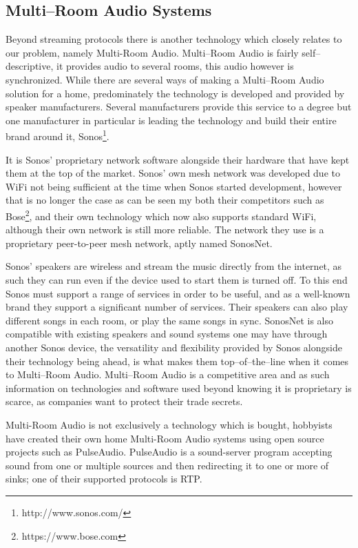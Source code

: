 \subsection{Multi--Room Audio Systems}
Beyond streaming protocols there is another technology which closely relates to our problem, namely Multi-Room Audio.
Multi--Room Audio is fairly self--descriptive, it provides audio to several rooms, this audio however is synchronized.
While there are several ways of making a Multi--Room Audio solution for a home, predominately the technology is developed and provided by speaker manufacturers.
Several manufacturers provide this service to a degree but one manufacturer in particular is leading the technology and build their entire brand around it, Sonos\footnote{http://www.sonos.com/}.

It is Sonos' proprietary network software alongside their hardware that have kept them at the top of the market.
Sonos' own mesh network was developed due to WiFi not being sufficient at the time when Sonos started development, however that is no longer the case as can be seen my both their competitors such as Bose\footnote{https://www.bose.com}, and their own technology which now also supports standard WiFi, although their own network is still more reliable.\cite{sonos1}
The network they use is a proprietary peer-to-peer mesh network, aptly named SonosNet.\cite{sonosWiki}

Sonos' speakers are wireless and stream the music directly from the internet, as such they can run even if the device used to start them is turned off.
To this end Sonos must support a range of services in order to be useful, and as a well-known brand they support a significant number of services.
Their speakers can also play different songs in each room, or play the same songs in sync.
SonosNet is also compatible with existing speakers and sound systems one may have through another Sonos device, the versatility and flexibility provided by Sonos alongside their technology being ahead, is what makes them top--of--the--line when it comes to Multi--Room Audio.\cite{sonos2}
Multi--Room Audio is a competitive area and as such information on technologies and software used beyond knowing it is proprietary is scarce, as companies want to protect their trade secrets.

Multi-Room Audio is not exclusively a technology which is bought, hobbyists have created their own home Multi-Room Audio systems using open source projects such as PulseAudio.\cite{pulseAudioHobbyist}
PulseAudio is a sound-server program accepting sound from one or multiple sources and then redirecting it to one or more of sinks; one of their supported protocols is \ac{RTP}.\cite{pulseAudioModules}

